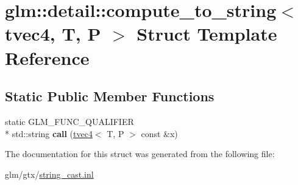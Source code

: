 \hypertarget{structglm_1_1detail_1_1compute__to__string_3_01tvec4_00_01T_00_01P_01_4}{\section{glm\-:\-:detail\-:\-:compute\-\_\-to\-\_\-string$<$ tvec4, T, P $>$ Struct Template Reference}
\label{structglm_1_1detail_1_1compute__to__string_3_01tvec4_00_01T_00_01P_01_4}
}
\subsection*{Static Public Member Functions}
\begin{DoxyCompactItemize}
\item 
\hypertarget{structglm_1_1detail_1_1compute__to__string_3_01tvec4_00_01T_00_01P_01_4_aa91e3c2d9b945aaf2dd840690de03437}{static G\-L\-M\-\_\-\-F\-U\-N\-C\-\_\-\-Q\-U\-A\-L\-I\-F\-I\-E\-R \\*
std\-::string {\bfseries call} (\hyperlink{structglm_1_1tvec4}{tvec4}$<$ T, P $>$ const \&x)}\label{structglm_1_1detail_1_1compute__to__string_3_01tvec4_00_01T_00_01P_01_4_aa91e3c2d9b945aaf2dd840690de03437}

\end{DoxyCompactItemize}


The documentation for this struct was generated from the following file\-:\begin{DoxyCompactItemize}
\item 
glm/gtx/\hyperlink{string__cast_8inl}{string\-\_\-cast.\-inl}\end{DoxyCompactItemize}
